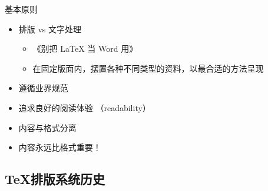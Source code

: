 \begin{frame}{基本原则}
\begin{itemize}
  \item<+-> 排版 vs 文字处理

    \begin{itemize}
      \item 《别把 \LaTeX{} 当 Word 用》
      \item {\scriptsize 在固定版面内，摆置各种不同类型的资料，以最合适的方法呈现 \href{https://zh.wikipedia.org/wiki/排版}{\faWikipediaW}}
    \end{itemize}

  \item<+-> 遵循业界规范
  \item<+-> 追求良好的阅读体验 （readability）
  \item<+-> 内容与格式分离
  \item<+-> \alert{内容永远比格式重要！}
\end{itemize}
\end{frame}

\subsection{\TeX 排版系统历史}

